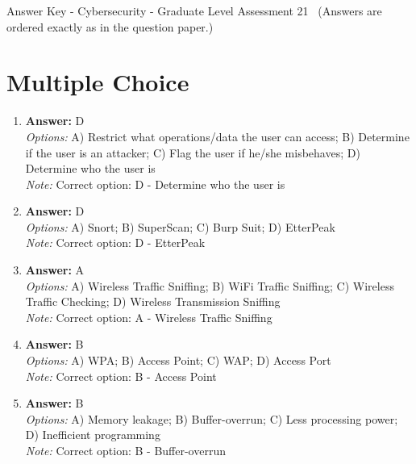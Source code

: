 \documentclass[12pt]{article}
\begin{document}
\begin{center}
Answer Key - Cybersecurity - Graduate Level Assessment 21 \
\small (Answers are ordered exactly as in the question paper.)
\end{center}

\section*{Multiple Choice}
\begin{enumerate}[label=\arabic*.]
\item \textbf{Answer:} D
\\ \textit{Options:} A) Restrict what operations/data the user can access; B) Determine if the user is an attacker; C) Flag the user if he/she misbehaves; D) Determine who the user is
\\ \textit{Note:} Correct option: D - Determine who the user is
\item \textbf{Answer:} D
\\ \textit{Options:} A) Snort; B) SuperScan; C) Burp Suit; D) EtterPeak
\\ \textit{Note:} Correct option: D - EtterPeak
\item \textbf{Answer:} A
\\ \textit{Options:} A) Wireless Traffic Sniffing; B) WiFi Traffic Sniffing; C) Wireless Traffic Checking; D) Wireless Transmission Sniffing
\\ \textit{Note:} Correct option: A - Wireless Traffic Sniffing
\item \textbf{Answer:} B
\\ \textit{Options:} A) WPA; B) Access Point; C) WAP; D) Access Port
\\ \textit{Note:} Correct option: B - Access Point
\item \textbf{Answer:} B
\\ \textit{Options:} A) Memory leakage; B) Buffer-overrun; C) Less processing power; D) Inefficient programming
\\ \textit{Note:} Correct option: B - Buffer-overrun
\end{enumerate}
\end{document}
